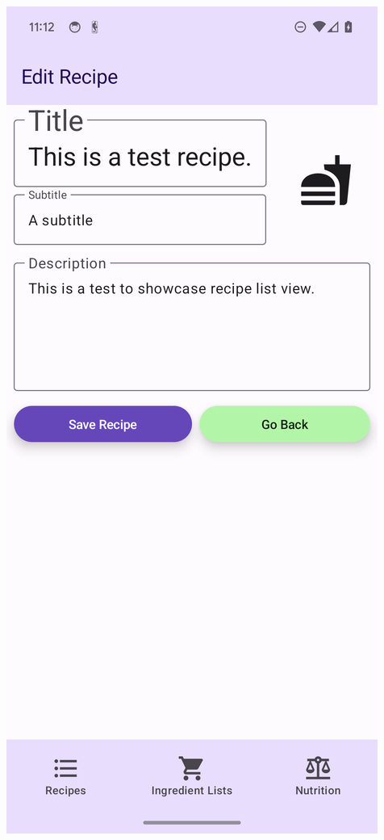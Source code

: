 \documentclass[12pt]{article}
\begin{document}
\begin{center}
\includegraphics[scale=0.175]{../res/img/EditRecipeLight.png}
\end{center}
    
\end{document}
